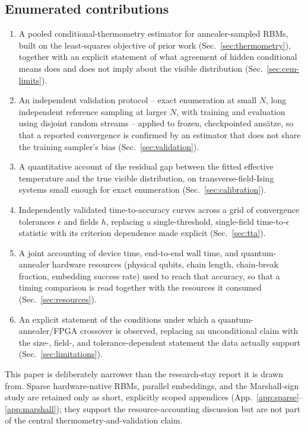 \subsection{Enumerated contributions}

\begin{enumerate}
\item A pooled conditional-thermometry estimator for annealer-sampled RBMs, built on the least-squares objective of prior work (Sec.~\ref{sec:thermometry}), together with an explicit statement of what agreement of hidden conditional means does and does not imply about the visible distribution (Sec.~\ref{sec:cem-limits}).
\item An independent validation protocol -- exact enumeration at small $N$, long independent reference sampling at larger $N$, with training and evaluation using disjoint random streams -- applied to frozen, checkpointed ansätze, so that a reported convergence is confirmed by an estimator that does not share the training sampler's bias (Sec.~\ref{sec:validation}).
\item A quantitative account of the residual gap between the fitted effective temperature and the true visible distribution, on transverse-field-Ising systems small enough for exact enumeration (Sec.~\ref{sec:calibration}).
\item Independently validated time-to-accuracy curves across a grid of convergence tolerances $\epsilon$ and fields $h$, replacing a single-threshold, single-field time-to-$\epsilon$ statistic with its criterion dependence made explicit (Sec.~\ref{sec:tta}).
\item A joint accounting of device time, end-to-end wall time, and quantum-annealer hardware resources (physical qubits, chain length, chain-break fraction, embedding success rate) used to reach that accuracy, so that a timing comparison is read together with the resources it consumed (Sec.~\ref{sec:resources}).
\item An explicit statement of the conditions under which a quantum-annealer/FPGA crossover is observed, replacing an unconditional claim with the size-, field-, and tolerance-dependent statement the data actually support (Sec.~\ref{sec:limitations}).
\end{enumerate}

This paper is deliberately narrower than the research-stay report it is drawn from. Sparse hardware-native RBMs, parallel embeddings, and the Marshall-sign study are retained only as short, explicitly scoped appendices (App.~\ref{app:sparse}--\ref{app:marshall}); they support the resource-accounting discussion but are not part of the central thermometry-and-validation claim.
